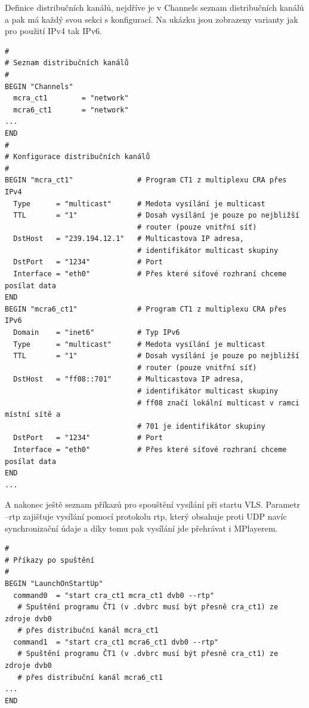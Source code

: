 \vspace{10pt}

Definice distribučních kanálů, nejdříve je v Channels seznam distribučních kanálů a pak má každý svou sekci s konfigurací. Na ukázku jsou zobrazeny varianty jak pro použití IPv4 tak IPv6.

\vspace{10pt}

\begin{small}
\begin{verbatim}
#
# Seznam distribučních kanálů
#
BEGIN "Channels"
  mcra_ct1        = "network"
  mcra6_ct1       = "network"
...
END
#
# Konfigurace distribučních kanálů
#
BEGIN "mcra_ct1"               # Program CT1 z multiplexu CRA přes IPv4
  Type      = "multicast"      # Medota vysílání je multicast
  TTL       = "1"              # Dosah vysílání je pouze po nejbližší 
                               # router (pouze vnitřní síť)
  DstHost   = "239.194.12.1"   # Multicastova IP adresa, 
                               # identifikátor multicast skupiny
  DstPort   = "1234"           # Port
  Interface = "eth0"           # Přes které síťové rozhraní chceme posílat data
END
BEGIN "mcra6_ct1"              # Program CT1 z multiplexu CRA přes IPv6
  Domain    = "inet6"          # Typ IPv6
  Type      = "multicast"      # Medota vysílání je multicast
  TTL       = "1"              # Dosah vysílání je pouze po nejbližší 
                               # router (pouze vnitřní síť)
  DstHost   = "ff08::701"      # Multicastova IP adresa, 
                               # identifikátor multicast skupiny
                               # ff08 značí lokální multicast v ramci místní sítě a 
                               # 701 je identifikátor skupiny
  DstPort   = "1234"           # Port
  Interface = "eth0"           # Přes které síťové rozhraní chceme posílat data
END
...

\end{verbatim}
\end{small}

\vspace{10pt}

A nakonec ještě seznam příkazů pro spouštění vysílání při startu VLS. Parametr --rtp zajišťuje vysílání pomocí protokolu rtp, který obsahuje proti UDP navíc synchronizační údaje a díky tomu pak vysílání jde přehrávat i MPlayerem.

\vspace{10pt}

\begin{small}
\begin{verbatim}
#
# Příkazy po spuštění
#
BEGIN "LaunchOnStartUp"
  command0  = "start cra_ct1 mcra_ct1 dvb0 --rtp"
   # Spuštění programu ČT1 (v .dvbrc musí být přesně cra_ct1) ze zdroje dvb0 
   # přes distribuční kanál mcra_ct1
  command1  = "start cra_ct1 mcra6_ct1 dvb0 --rtp"   
   # Spuštění programu ČT1 (v .dvbrc musí být přesně cra_ct1) ze zdroje dvb0 
   # přes distribuční kanál mcra6_ct1
...
END

\end{verbatim}
\end{small}

